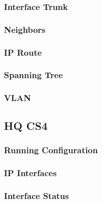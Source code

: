 \subsubsection{Interface Trunk}


\subsubsection{Neighbors}


\subsubsection{IP Route}


\subsubsection{Spanning Tree}


\subsubsection{VLAN}






\subsection{HQ CS4}
\subsubsection{Running Configuration}


\subsubsection{IP Interfaces}


\subsubsection{Interface Status}


